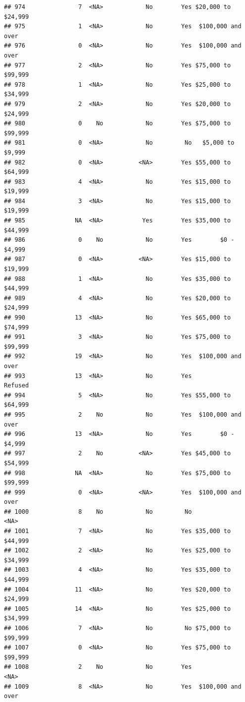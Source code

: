 \documentclass[man]{apa6}
\begin{document}
\begin{verbatim}
## 974               7  <NA>            No        Yes $20,000 to $24,999
## 975               1  <NA>            No        Yes  $100,000 and over
## 976               0  <NA>            No        Yes  $100,000 and over
## 977               2  <NA>            No        Yes $75,000 to $99,999
## 978               1  <NA>            No        Yes $25,000 to $34,999
## 979               2  <NA>            No        Yes $20,000 to $24,999
## 980               0    No            No        Yes $75,000 to $99,999
## 981               0  <NA>            No         No   $5,000 to $9,999
## 982               0  <NA>          <NA>        Yes $55,000 to $64,999
## 983               4  <NA>            No        Yes $15,000 to $19,999
## 984               3  <NA>            No        Yes $15,000 to $19,999
## 985              NA  <NA>           Yes        Yes $35,000 to $44,999
## 986               0    No            No        Yes        $0 - $4,999
## 987               0  <NA>          <NA>        Yes $15,000 to $19,999
## 988               1  <NA>            No        Yes $35,000 to $44,999
## 989               4  <NA>            No        Yes $20,000 to $24,999
## 990              13  <NA>            No        Yes $65,000 to $74,999
## 991               3  <NA>            No        Yes $75,000 to $99,999
## 992              19  <NA>            No        Yes  $100,000 and over
## 993              13  <NA>            No        Yes            Refused
## 994               5  <NA>            No        Yes $55,000 to $64,999
## 995               2    No            No        Yes  $100,000 and over
## 996              13  <NA>            No        Yes        $0 - $4,999
## 997               2    No          <NA>        Yes $45,000 to $54,999
## 998              NA  <NA>            No        Yes $75,000 to $99,999
## 999               0  <NA>          <NA>        Yes  $100,000 and over
## 1000              8    No            No         No               <NA>
## 1001              7  <NA>            No        Yes $35,000 to $44,999
## 1002              2  <NA>            No        Yes $25,000 to $34,999
## 1003              4  <NA>            No        Yes $35,000 to $44,999
## 1004             11  <NA>            No        Yes $20,000 to $24,999
## 1005             14  <NA>            No        Yes $25,000 to $34,999
## 1006              7  <NA>            No         No $75,000 to $99,999
## 1007              0  <NA>            No        Yes $75,000 to $99,999
## 1008              2    No            No        Yes               <NA>
## 1009              8  <NA>            No        Yes  $100,000 and over

\end{verbatim}
\end{document}

